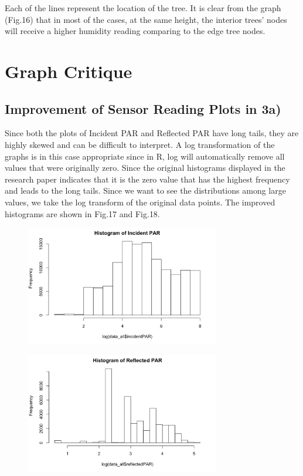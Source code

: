 \documentclass[twocolumn,11pt]{asme2ej}
\begin{document}
Each of the lines represent the location of the tree. It is clear from the graph (Fig.16) that in most of the cases, at the same height, the interior trees' nodes will receive a higher humidity reading comparing to the edge tree nodes. 

\section{Graph Critique}
\subsection{Improvement of Sensor Reading Plots in 3a)}

Since both the plots of Incident PAR and Reflected PAR have long tails, they are highly skewed and can be difficult to interpret. A log transformation of the graphs is in this case appropriate since in R, log will automatically remove all values that were originally zero. Since the original histograms displayed in the research paper indicates that it is the zero value that has the highest frequency and leads to the long tails. Since we want to see the distributions among large values, we take the log transform of the original data points. The improved histograms are shown in Fig.17 and Fig.18. 

\begin{figure}
    \centering
    \includegraphics[width=85mm]{5a.png} 
    \caption{}
    \label{fig:5a}
\end{figure}

\begin{figure}
    \centering
    \includegraphics[width=85mm]{5a2.png} 
    \caption{}
    \label{fig:5a2}
\end{figure}
\end{document}
